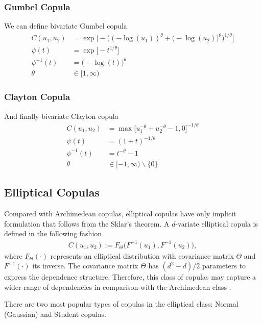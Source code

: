 \documentclass[12pt]{article}
\begin{document}
	\subsubsection{Gumbel Copula} We can define bivariate Gumbel copula
	\begin{align}
	C(u_1, u_2) &= \exp\bigg[-\Big((-\log(u_1))^\theta + \big(-\log(u_2)\big)^\theta\Big)^{1/\theta}\bigg] \\
	\psi(t) &= \exp\big[-t^{1/\theta}\big] \\
	\psi^{-1}(t) &= \big(-\log(t)\big)^\theta \\
	\theta &\in [1, \infty)
	\end{align}
	
	\subsubsection{Clayton Copula} And finally bivariate Clayton copula
	\begin{align}
	C(u_1, u_2) &= \max\big[u_1^{-\theta}+u_2^{-\theta}-1, 0\big]^{-1/\theta} \\
	\psi(t) &= (1+t)^{-1/\theta} \\
	\psi^{-1}(t) &= t^{-\theta}-1 \\
	\theta &\in [-1, \infty) \backslash \{0\}
	\end{align}
	
	\subsection{Elliptical Copulas}
	
	Compared with Archimedean copulas, elliptical copulas have only implicit formulation that follows from the Sklar's theorem. A $ d $-variate elliptical copula is defined in the following fashion
	\begin{align}
	C(u_1, u_2) := F_\Theta\big(F^{-1}(u_1), F^{-1}(u_2)\big),
	\end{align}
	where $ F_\Theta(\cdot) $ represents an elliptical distribution with covariance matrix $ \Theta $ and $ F^{-1}(\cdot) $ its inverse. The covariance matrix $ \Theta $ has $ (d^2 - d)/2 $ parameters to express the dependence structure. Therefore, this class of copulas may capture a wider range of dependencies in comparison with the Archimedean class \parencite{Hyrs2015}.
	
	There are two most popular types of copulas in the elliptical class: Normal (Gaussian) and Student copulas.
	
\end{document}
